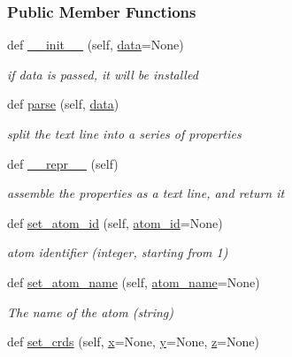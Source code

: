 \subsubsection*{Public Member Functions}
\begin{DoxyCompactItemize}
\item 
def \hyperlink{classsrc_1_1Mol2_1_1mol2__atom_ad0cd7d2c4aa948444e6ebb8090508689}{\+\_\+\+\_\+init\+\_\+\+\_\+} (self, \hyperlink{namespacesrc_1_1Mol2_a12bf18db47042b1704de5e1fb05b2ade}{data}=None)
\begin{DoxyCompactList}\small\item\em if data is passed, it will be installed \end{DoxyCompactList}\item 
def \hyperlink{classsrc_1_1Mol2_1_1mol2__atom_ae32d7dfab8bcae5050d7129037dbc94c}{parse} (self, \hyperlink{namespacesrc_1_1Mol2_a12bf18db47042b1704de5e1fb05b2ade}{data})
\begin{DoxyCompactList}\small\item\em split the text line into a series of properties \end{DoxyCompactList}\item 
def \hyperlink{classsrc_1_1Mol2_1_1mol2__atom_af9d41c384b057ff1f813baa4dfb9360d}{\+\_\+\+\_\+repr\+\_\+\+\_\+} (self)
\begin{DoxyCompactList}\small\item\em assemble the properties as a text line, and return it \end{DoxyCompactList}\item 
def \hyperlink{classsrc_1_1Mol2_1_1mol2__atom_a25cff4aebd3f1f50ae4946602a47467e}{set\+\_\+atom\+\_\+id} (self, \hyperlink{classsrc_1_1Mol2_1_1mol2__atom_ae1c8c0e30fbdc4448c58d4e920e2780e}{atom\+\_\+id}=None)
\begin{DoxyCompactList}\small\item\em atom identifier (integer, starting from 1) \end{DoxyCompactList}\item 
def \hyperlink{classsrc_1_1Mol2_1_1mol2__atom_a54d21f9992f0b3344129d7dc5b767fac}{set\+\_\+atom\+\_\+name} (self, \hyperlink{classsrc_1_1Mol2_1_1mol2__atom_a9917351f99ebd55b507fa4d13678ce3f}{atom\+\_\+name}=None)
\begin{DoxyCompactList}\small\item\em The name of the atom (string) \end{DoxyCompactList}\item 
def \hyperlink{classsrc_1_1Mol2_1_1mol2__atom_ae6f5843df04daaed5ec208b4ef6bc8a5}{set\+\_\+crds} (self, \hyperlink{classsrc_1_1Mol2_1_1mol2__atom_a47de8acee587e81e83a34d13cec168e8}{x}=None, \hyperlink{classsrc_1_1Mol2_1_1mol2__atom_a72e7b8443dc04e8f96dafd74ebb27f1c}{y}=None, \hyperlink{classsrc_1_1Mol2_1_1mol2__atom_ad7bd1ddebc525163f12de1e11b51bf02}{z}=None)

\end{DoxyCompactItemize}
